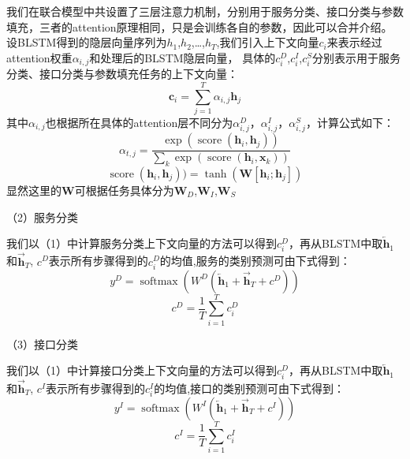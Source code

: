 我们在联合模型中共设置了三层注意力机制，分别用于服务分类、接口分类与参数填充，三者的attention原理相同，只是会训练各自的参数，因此可以合并介绍。
设BLSTM得到的隐层向量序列为$h_{1}$,$h_{2}$,\dots,$h_{T}$,我们引入上下文向量${c}_{i}$来表示经过attention权重$α_{i,j}$和处理后的BLSTM隐层向量，
具体的${c}_{i}^{D}$,${c}_{i}^{I}$,${c}_{i}^{S}$分别表示用于服务分类、接口分类与参数填充任务的上下文向量：
\begin{equation}
    \mathbf{c}_{i}=\sum_{j=1}^{T} \alpha_{i, j} \mathbf{h}_{j}
  \end{equation}
  其中$\alpha_{i, j}$也根据所在具体的attention层不同分为$\alpha_{i, j}^{D}$，$\alpha_{i, j}^{I}$，$\alpha_{i, j}^{S}$，计算公式如下：
  \begin{equation}
    \alpha_{t, j}=\frac{\exp \left(\operatorname{score}\left(\mathbf{h}_{i}, \mathbf{h}_{j}\right)\right)}{\sum_{k} \exp \left(\operatorname{score}\left(\mathbf{h}_{i}, \mathbf{x}_{k}\right)\right)}
    \end{equation}
    \begin{equation}
      \operatorname{score}(\mathbf{h}_{i}, \mathbf{h}_{j}))=\tanh \left(\mathbf{W}\left[\mathbf{h}_{i} ; \mathbf{h}_{j}\right]\right)
    \end{equation}
显然这里的$\mathbf{W}$可根据任务具体分为$\mathbf{W}_D$,$\mathbf{W}_I$,$\mathbf{W}_S$

（2）服务分类

我们以（1）中计算服务分类上下文向量的方法可以得到${c}_{i}^{D}$，再从BLSTM中取$\overleftarrow{\mathbf{h}}_{1}$和$\overrightarrow{\mathbf{h}}_{T}$,
$c^{D}$表示所有步骤得到的$c_i^{D}$的均值,服务的类别预测可由下式得到：
\begin{equation}
    y^{D}=\operatorname{softmax}\left(W^{D}\left(\overleftarrow{\mathbf{h}}_{1}+\overrightarrow{\mathbf{h}}_{T}+c^{D}\right)\right)
  \end{equation}
  \begin{equation}
    c^{D}=\frac{1}{T}\sum_{i=1}^{T} c_i^{D}
  \end{equation}

（3）接口分类

  我们以（1）中计算接口分类上下文向量的方法可以得到${c}_{i}^{D}$，再从BLSTM中取$\overleftarrow{\mathbf{h}}_{1}$和$\overrightarrow{\mathbf{h}}_{T}$,
  $c^{I}$表示所有步骤得到的$c_i^{I}$的均值,接口的类别预测可由下式得到：
  \begin{equation}
      y^{I}=\operatorname{softmax}\left(W^{I}\left(\overleftarrow{\mathbf{h}}_{1}+\overrightarrow{\mathbf{h}}_{T}+c^{I}\right)\right)
    \end{equation} 
    \begin{equation}
        c^{I}=\frac{1}{T}\sum_{i=1}^{T} c_i^{I}
      \end{equation}

